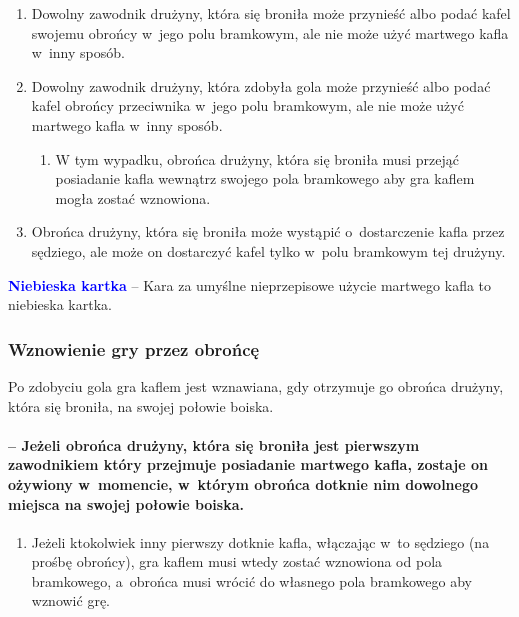 \documentclass[12pt]{article}
\newcommand\bluecard[1]{\bgroup\textcolor{blue}{\textbf{#1}}}
\begin{document}
\begin{enumerate}
	\item
	      Dowolny zawodnik drużyny, która się broniła może przynieść albo podać
	      kafel swojemu obrońcy w~jego polu bramkowym, ale nie może użyć
	      martwego kafla w~inny sposób.
	\item
	      Dowolny zawodnik drużyny, która zdobyła gola może przynieść albo podać
	      kafel obrońcy przeciwnika w~jego polu bramkowym, ale nie może użyć
	      martwego kafla w~inny sposób.

	      \begin{enumerate}
		      \item
		            W tym wypadku, obrońca drużyny, która się broniła musi przejąć
		            posiadanie kafla wewnątrz swojego pola bramkowego aby gra kaflem
		            mogła zostać wznowiona.
	      \end{enumerate}
	\item
	      Obrońca drużyny, która się broniła może wystąpić o~dostarczenie kafla
	      przez sędziego, ale może on dostarczyć kafel tylko w~polu bramkowym
	      tej drużyny.
\end{enumerate}

\bluecard{Niebieska kartka} -- Kara za umyślne nieprzepisowe użycie martwego
kafla to niebieska kartka.

\subsubsection{Wznowienie gry przez obrońcę}
Po zdobyciu gola gra
kaflem jest wznawiana, gdy otrzymuje go obrońca drużyny, która się
broniła, na swojej połowie boiska.

\paragraph{ -- Jeżeli obrońca drużyny, która się broniła jest
	pierwszym zawodnikiem który przejmuje posiadanie martwego kafla, zostaje
	on ożywiony w~momencie, w~którym obrońca dotknie nim dowolnego miejsca
	na swojej połowie boiska.}

\begin{enumerate}
	\item
	      Jeżeli ktokolwiek inny pierwszy dotknie kafla, włączając w~to sędziego
	      (na prośbę obrońcy), gra kaflem musi wtedy zostać wznowiona od pola
	      bramkowego, a~obrońca musi wrócić do własnego pola bramkowego aby
	      wznowić grę.
\end{enumerate}
\end{document}
